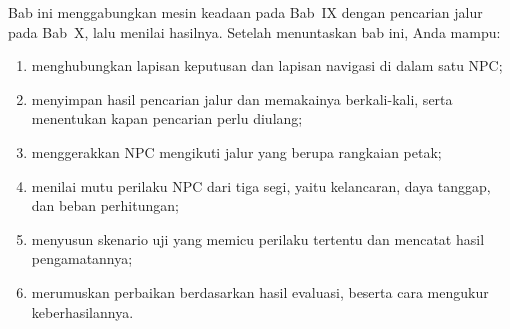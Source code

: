 \begin{tujuanbox}
Bab ini menggabungkan mesin keadaan pada Bab~IX dengan pencarian jalur pada
Bab~X, lalu menilai hasilnya. Setelah menuntaskan bab ini, Anda mampu:
\begin{enumerate}
  \item menghubungkan lapisan keputusan dan lapisan navigasi di dalam satu NPC;
  \item menyimpan hasil pencarian jalur dan memakainya berkali-kali, serta
        menentukan kapan pencarian perlu diulang;
  \item menggerakkan NPC mengikuti jalur yang berupa rangkaian petak;
  \item menilai mutu perilaku NPC dari tiga segi, yaitu kelancaran, daya
        tanggap, dan beban perhitungan;
  \item menyusun skenario uji yang memicu perilaku tertentu dan mencatat hasil
        pengamatannya;
  \item merumuskan perbaikan berdasarkan hasil evaluasi, beserta cara mengukur
        keberhasilannya.
\end{enumerate}
\end{tujuanbox}
